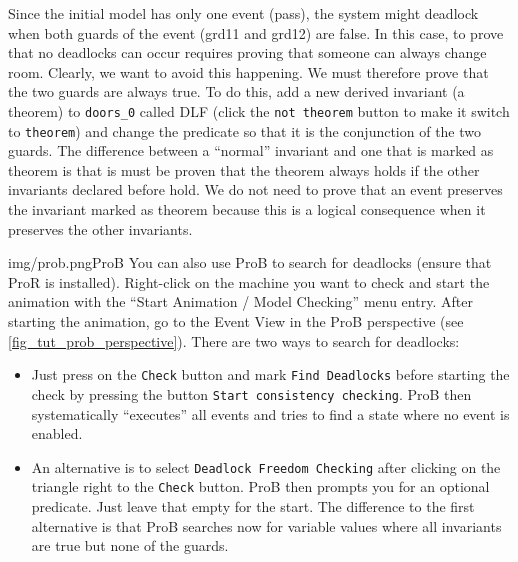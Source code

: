 Since the initial model has only one event (\textsf{pass}), the system might deadlock when both guards of the event (\textsf{grd11} and \textsf{grd12}) are false.
In this case, to prove that no deadlocks can occur requires proving that someone can always change room.
Clearly, we want to avoid this happening. We must therefore prove that the two guards are always true. 
To do this, add a new derived invariant (a theorem) to \texttt{doors\_0} called \textsf{DLF} (click the \texttt{not theorem} button to make it switch to \texttt{theorem})
  and change the predicate so that it is the conjunction of the two guards.
The difference between a ``normal'' invariant and one that is marked as theorem is that is must be proven that the theorem always holds if the other invariants
  declared before hold.
 We do not need to prove that an event preserves the invariant marked as theorem because this is a logical consequence when it preserves the other invariants.

\begin{description}
\INVARIANTS
	\begin{description}
	\end{description}
\end{description}

\begin{rodin-plugin}{img/prob.png}{ProB}%
  You can also use ProB to search for deadlocks (ensure that ProR is installed).
  Right-click on the machine you want to check and start the animation with the
  ``Start Animation / Model Checking'' menu entry.
  After starting the animation, go to the Event View in the ProB perspective
  (see \ref{fig_tut_prob_perspective}).
  There are two ways to search for deadlocks:
  \begin{itemize}
  \item Just press on the \texttt{Check} button and mark \texttt{Find Deadlocks} before
    starting the check by pressing the button \texttt{Start consistency checking}.
    ProB then systematically ``executes'' all events and tries to find a state where no
    event is enabled.
  \item An alternative is to select \texttt{Deadlock Freedom Checking} after clicking
    on the triangle right to the \texttt{Check} button.
    ProB then prompts you for an optional predicate. Just leave that empty for the start.
    The difference to the first alternative is that ProB searches now for variable values
    where all invariants are true but none of the guards.
  \end{itemize}
\end{rodin-plugin}

